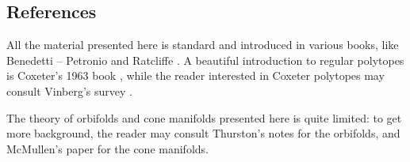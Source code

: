 \subsection{References}
All the material presented here is standard and introduced in various books, like Benedetti -- Petronio \cite{BP} and Ratcliffe \cite{R}. A beautiful introduction to regular polytopes is Coxeter's 1963 book \cite{Cox}, while the reader interested in Coxeter polytopes may consult Vinberg's survey \cite{Vin}.

The theory of orbifolds and cone manifolds presented here is quite limited: to get more background, the reader may consult Thurston's notes \cite[Chapter 13]{Th} for the orbifolds, and McMullen's paper \cite{McM-cone} for the cone manifolds.


